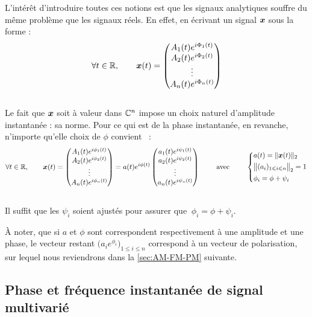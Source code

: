 L'intérêt d'introduire toutes ces notions est que les signaux analytiques souffre du même problème que les signaux réels. 
En effet, en écrivant un signal $\boldsymbol{x}$ sous la forme :
\[\forall t\in\mathbb{R},\qquad 
\boldsymbol{x}(t) = \begin{pmatrix} A_1(t)e^{i\Phi_1(t)} \\ A_2(t)e^{i\Phi_2(t)} \\ \vdots \\ A_n(t)e^{i\Phi_n(t)}
\end{pmatrix}\]
\\
Le fait que $\boldsymbol{x}$ soit à valeur dans $\mathbb{C}^n$ impose un choix naturel d'amplitude instantanée : sa norme. Pour ce qui est de la phase instantanée, en revanche, n'importe qu'elle choix de $\phi$ convient \apriori~:
\[\forall t\in\mathbb{R},\qquad 
\boldsymbol{x}(t) = \begin{pmatrix} A_1(t)e^{i\phi_1(t)} \\ A_2(t)e^{i\phi_2(t)} \\ \vdots \\ A_n(t)e^{i\phi_n(t)} \end{pmatrix}
= a(t)e^{i\phi(t)}\begin{pmatrix} a_1(t)e^{i\psi_1(t)} \\ a_2(t)e^{i\psi_2(t)} \\ \vdots \\ a_n(t)e^{i\psi_n(t)} \end{pmatrix}
\qquad\text{ avec }\qquad 
\left\{ \begin{aligned}
	& a(t) = \| \boldsymbol{x}(t) \|_2 \\
	& \big\|(a_i)_{1\leqslant i\leqslant n}\big\|_2 = 1 \\
	& \phi_i = \phi + \psi_i \end{aligned}\right.\]
\\
Il suffit que les $\psi_i$ soient ajustés pour assurer que $\ \phi_i = \phi + \psi_i$.
\\
\begin{remarque}
	À noter, que si $a$ et $\phi$ sont correspondent respectivement à une amplitude et une phase, le vecteur restant $\big( a_ie^{\phi_i} \big)_{1\leq i\leq n}$ correspond à un vecteur de polarisation, sur lequel nous reviendrons dans la \cref{sec:AM-FM-PM} suivante.
\end{remarque}



\subsection{Phase et fréquence instantanée de signal multivarié }\label{sec:param_instant_nvar}

